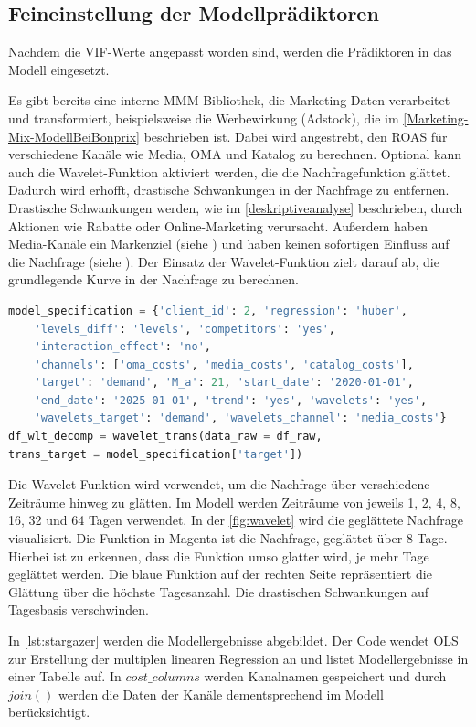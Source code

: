 \subsection{Feineinstellung der Modellprädiktoren}
\label{EinsatzDesMarketing-Mix-Modells}
Nachdem die \ac{VIF}-Werte angepasst worden sind, werden die Prädiktoren in das Modell eingesetzt. \par
Es gibt bereits eine interne \ac{MMM}-Bibliothek, die Marketing-Daten verarbeitet und transformiert, beispielsweise die Werbewirkung (Adstock), die im \autoref{Marketing-Mix-ModellBeiBonprix} beschrieben ist. Dabei wird angestrebt, den \ac{ROAS} für verschiedene Kanäle wie Media, \ac{OMA} und Katalog zu berechnen. Optional kann auch die Wavelet-Funktion aktiviert werden, die die Nachfragefunktion glättet. Dadurch wird erhofft, drastische Schwankungen in der Nachfrage zu entfernen. Drastische Schwankungen werden, wie im \autoref{deskriptiveanalyse} beschrieben, durch Aktionen wie Rabatte oder Online-Marketing verursacht. Außerdem haben Media-Kanäle ein Markenziel (siehe ) und haben keinen sofortigen Einfluss auf die Nachfrage (siehe ). Der Einsatz der Wavelet-Funktion zielt darauf ab, die grundlegende Kurve in der Nachfrage zu berechnen.  
\begin{lstlisting}[language=Python, linewidth=\textwidth]
model_specification = {'client_id': 2, 'regression': 'huber', 
    'levels_diff': 'levels', 'competitors': 'yes', 
    'interaction_effect': 'no', 
    'channels': ['oma_costs', 'media_costs', 'catalog_costs'],
    'target': 'demand', 'M_a': 21, 'start_date': '2020-01-01', 
    'end_date': '2025-01-01', 'trend': 'yes', 'wavelets': 'yes', 
    'wavelets_target': 'demand', 'wavelets_channel': 'media_costs'}
df_wlt_decomp = wavelet_trans(data_raw = df_raw, 
trans_target = model_specification['target'])
\end{lstlisting}
Die Wavelet-Funktion wird verwendet, um die Nachfrage über verschiedene Zeiträume hinweg zu glätten. Im Modell werden Zeiträume von jeweils 1, 2, 4, 8, 16, 32 und 64 Tagen verwendet. In der \autoref{fig:wavelet} wird die geglättete Nachfrage visualisiert. Die Funktion in Magenta ist die Nachfrage, geglättet über 8 Tage. Hierbei ist zu erkennen, dass die Funktion umso glatter wird, je mehr Tage geglättet werden. Die blaue Funktion auf der rechten Seite repräsentiert die Glättung über die höchste Tagesanzahl. Die drastischen Schwankungen auf Tagesbasis verschwinden. \par
In \autoref{lst:stargazer} werden die Modellergebnisse abgebildet. Der Code wendet \ac{OLS} zur Erstellung der multiplen linearen Regression an und listet Modellergebnisse in einer Tabelle auf. In \(cost\_columns\) werden Kanalnamen gespeichert und durch \(join()\) werden die Daten der Kanäle dementsprechend im Modell berücksichtigt. 
